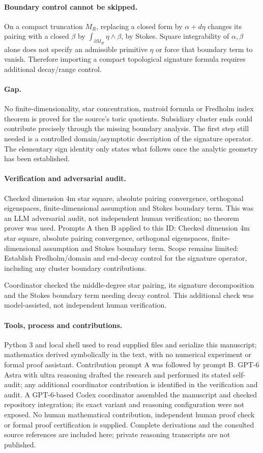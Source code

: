 \documentclass[11pt]{article}
\begin{document}
\paragraph{Boundary control cannot be skipped.}On a compact truncation \(M_R\), replacing a closed form by \(\alpha+d\eta\) changes its pairing with a closed \(\beta\) by \(\int_{\partial M_R}\eta\wedge\beta\), by Stokes. Square integrability of \(\alpha,\beta\) alone does not specify an admissible primitive \(\eta\) or force that boundary term to vanish. Therefore importing a compact topological signature formula requires additional decay/range control.
\paragraph{Gap.}No finite-dimensionality, star concentration, matroid formula or Fredholm index theorem is proved for the source's toric quotients. Subsidiary cluster ends could contribute precisely through the missing boundary analysis. The first step still needed is a controlled domain/asymptotic description of the signature operator. The elementary sign identity only states what follows once the analytic geometry has been established.

\paragraph{Verification and adversarial audit.}
Checked dimension 4m star square, absolute pairing convergence, orthogonal eigenspaces, finite-dimensional assumption and Stokes boundary term. This was an LLM adversarial audit, not independent human verification; no theorem prover was used. Prompts A then B applied to this ID: Checked dimension 4m star square, absolute pairing convergence, orthogonal eigenspaces, finite-dimensional assumption and Stokes boundary term. Scope remains limited: Establish Fredholm/domain and end-decay control for the signature operator, including any cluster boundary contributions.

Coordinator checked the middle-degree star pairing, its signature decomposition and the Stokes boundary term needing decay control. This additional check was model-assisted, not independent human verification.

\paragraph{Tools, process and contributions.}
Python 3 and local shell used to read supplied files and serialize this manuscript; mathematics derived symbolically in the text, with no numerical experiment or formal proof assistant. Contribution prompt A was followed by prompt B. GPT-6 Astra with ultra reasoning drafted the research and performed its stated self-audit; any additional coordinator contribution is identified in the verification and audit. A GPT-6-based Codex coordinator assembled the manuscript and checked repository integration; its exact variant and reasoning configuration were not exposed. No human mathematical contribution, independent human proof check or formal proof certification is supplied. Complete derivations and the consulted source references are included here; private reasoning transcripts are not published.
\end{document}
